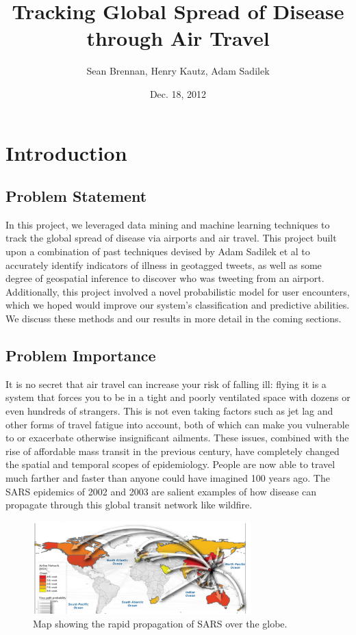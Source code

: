 \documentclass[11pt, letterpaper]{article}
\title{Tracking Global Spread of Disease through Air Travel}
\author{Sean Brennan, Henry Kautz, Adam Sadilek}
\date{Dec. 18, 2012}
\begin{document}
    \maketitle

    \section{Introduction}
        \subsection{Problem Statement}
            In this project, we leveraged data mining and machine learning techniques to track the global spread of disease via airports and air travel. This project built upon a combination of past techniques devised by Adam Sadilek et al to accurately identify indicators of illness in geotagged tweets, as well as some degree of geospatial inference to discover who was tweeting from an airport. Additionally, this project involved a novel probabilistic model for user encounters, which we hoped would improve our system's classification and predictive abilities. We discuss these methods and our results in more detail in the coming sections.

        \subsection{Problem Importance}
            It is no secret that air travel can increase your risk of falling ill: flying it is a system that forces you to be in a tight and poorly ventilated space with dozens or even hundreds of strangers. This is not even taking factors such as jet lag and other forms of travel fatigue into account, both of which can make you vulnerable to or exacerbate otherwise insignificant ailments. These issues, combined with the rise of affordable mass transit in the previous century, have completely changed the spatial and temporal scopes of epidemiology. People are now able to travel much farther and faster than anyone could have imagined 100 years ago. The SARS epidemics of 2002 and 2003 are salient examples of how disease can propagate through this global transit network like wildfire.

            \begin{figure}[b!]
                \begin{center}
                    \includegraphics[width=0.75\textwidth]{sars-example.png}
                    \caption{Map showing the rapid propagation of SARS over the globe. \cite{colizza}}
                    \label{meetings-example}
                \end{center}
            \end{figure}
\end{document}
